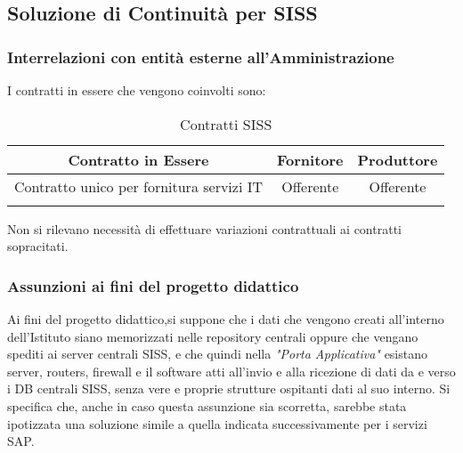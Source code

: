 \newpage
\subsection{Soluzione di Continuità per SISS}
\subsubsection{Interrelazioni con entità esterne all’Amministrazione}
I contratti in essere che vengono coinvolti sono:
\renewcommand \arraystretch{1,5}
\begin{longtable}{c c c}
\toprule
\textbf{Contratto in Essere} & \textbf{Fornitore} & \textbf{Produttore} \\
\toprule
	Contratto unico per fornitura servizi IT & Offerente & Offerente \\
\bottomrule
\caption{Contratti SISS}
\end{longtable}
Non si rilevano necessità di effettuare variazioni contrattuali ai contratti sopracitati.
\subsubsection{Assunzioni ai fini del progetto didattico}
Ai fini del progetto didattico,si suppone che i dati che vengono creati all'interno dell'Istituto siano memorizzati nelle repository centrali oppure che vengano spediti ai server centrali SISS, e che quindi nella \textit{"Porta Applicativa"} esistano server, routers, firewall e il software atti all'invio e alla ricezione di dati da e verso i DB centrali SISS, senza vere e proprie strutture ospitanti dati al suo interno. Si specifica che, anche in caso questa assunzione sia scorretta, sarebbe stata ipotizzata una soluzione simile a quella indicata successivamente per i servizi SAP.
